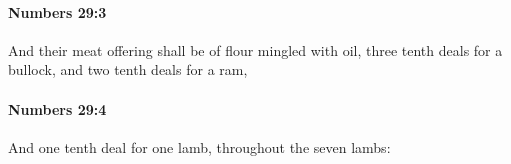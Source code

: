 		\paragraph{Numbers 29:3} %
			\label{NUMBERS-29-3}

			And their meat offering shall be of flour mingled with oil, three tenth deals for a bullock, and two tenth deals for a ram,


		\paragraph{Numbers 29:4} %
			\label{NUMBERS-29-4}

			And one tenth deal for one lamb, throughout the seven lambs:


